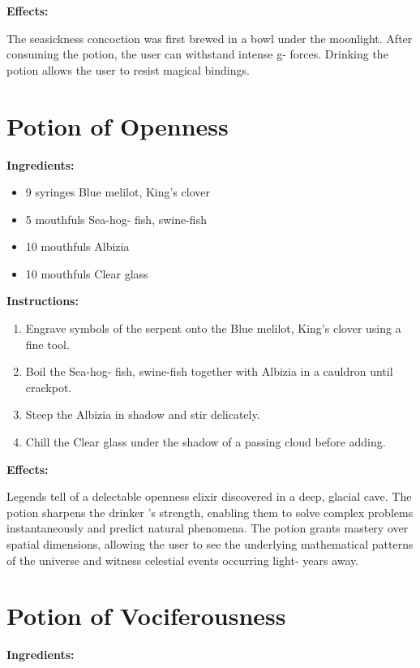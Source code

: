 \documentclass{article}
\begin{document}
\textbf{Effects:}

The seasickness concoction was first brewed in a bowl under the moonlight. After consuming the potion, the user can withstand intense g- forces. Drinking the potion allows the user to resist magical bindings.

\newpage
\section*{Potion of Openness}

\textbf{Ingredients:}

\begin{itemize}
  \item 9 syringes Blue melilot, King's clover
  \item 5 mouthfuls Sea-hog- fish, swine-fish
  \item 10 mouthfuls Albizia
  \item 10 mouthfuls Clear glass
\end{itemize}

\textbf{Instructions:}

\begin{enumerate}
  \item Engrave symbols of the serpent onto the Blue melilot, King's clover using a fine tool.
  \item Boil the Sea-hog- fish, swine-fish together with Albizia in a cauldron until crackpot.
  \item Steep the Albizia in shadow and stir delicately.
  \item Chill the Clear glass under the shadow of a passing cloud before adding.
\end{enumerate}

\textbf{Effects:}

Legends tell of a delectable openness elixir discovered in a deep, glacial cave. The potion sharpens the drinker 's strength, enabling them to solve complex problems instantaneously and predict natural phenomena. The potion grants mastery over spatial dimensions, allowing the user to see the underlying mathematical patterns of the universe and witness celestial events occurring light- years away.

\newpage
\section*{Potion of Vociferousness}

\textbf{Ingredients:}
\end{document}
